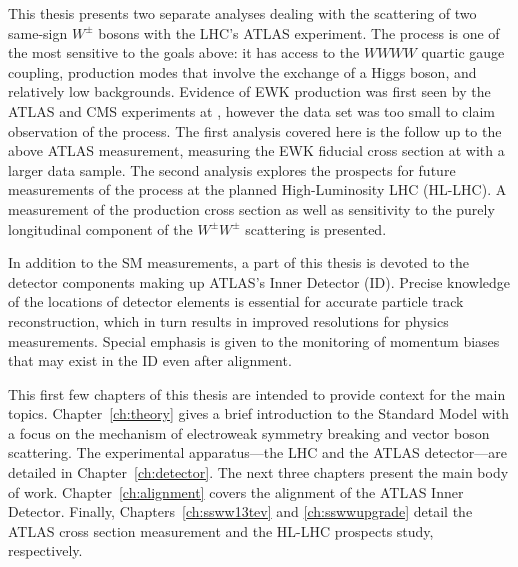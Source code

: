 This thesis presents two separate analyses dealing with the scattering of two same-sign $W^{\pm}$ bosons with the LHC's ATLAS experiment.
The \ssww process is one of the most sensitive to the goals above: it has access to the $WWWW$ quartic gauge coupling, production modes that involve the exchange of a Higgs boson, and relatively low backgrounds.
Evidence of EWK \ssww production was first seen by the ATLAS and CMS experiments at , however the data set was too small to claim observation of the process.
The first analysis covered here is the follow up to the above ATLAS measurement, measuring the EWK fiducial cross section at  with a larger data sample.
The second analysis explores the prospects for future measurements of the \ssww process at the planned High-Luminosity LHC (HL-LHC).
A measurement of the production cross section as well as sensitivity to the purely longitudinal component of the $W^{\pm}W^{\pm}$ scattering is presented.

In addition to the SM measurements, a part of this thesis is devoted to the detector components making up ATLAS's Inner Detector (ID).
Precise knowledge of the locations of detector elements is essential for accurate particle track reconstruction, which in turn results in improved resolutions for physics measurements.
Special emphasis is given to the monitoring of momentum biases that may exist in the ID even after alignment.

This first few chapters of this thesis are intended to provide context for the main topics.
Chapter~\ref{ch:theory} gives a brief introduction to the Standard Model with a focus on the mechanism of electroweak symmetry breaking and vector boson scattering.
The experimental apparatus---the LHC and the ATLAS detector---are detailed in Chapter~\ref{ch:detector}.
The next three chapters present the main body of work.
Chapter~\ref{ch:alignment} covers the alignment of the ATLAS Inner Detector.
Finally, Chapters~\ref{ch:ssww13tev} and \ref{ch:sswwupgrade} detail the ATLAS  \ssww cross section measurement and the  HL-LHC \ssww prospects study, respectively.

